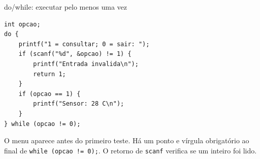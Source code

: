 \begin{frame}[fragile]{do/while: executar pelo menos uma vez}
\begin{lstlisting}
int opcao;
do {
    printf("1 = consultar; 0 = sair: ");
    if (scanf("%d", &opcao) != 1) {
        printf("Entrada invalida\n");
        return 1;
    }
    if (opcao == 1) {
        printf("Sensor: 28 C\n");
    }
} while (opcao != 0);
\end{lstlisting}
O menu aparece antes do primeiro teste. Há um ponto e vírgula obrigatório ao final de \texttt{while (opcao != 0);}. O retorno de \texttt{scanf} verifica se um inteiro foi lido.
\end{frame}

